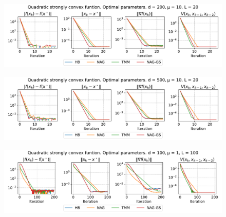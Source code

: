 \documentclass[a4paper,11pt]{article}
\begin{document}
\begin{figure}[h!]
 \centering
 \includegraphics[width=\linewidth]{quad_simple_optimal_200.pdf}
\end{figure}

\begin{figure}[h!]
 \centering
 \includegraphics[width=\linewidth]{quad_simple_optimal_500.pdf}
\end{figure}

\begin{figure}[h!]
 \centering
 \includegraphics[width=\linewidth]{quad_simple_optimal_100_100.pdf}
\end{figure}
\end{document}
